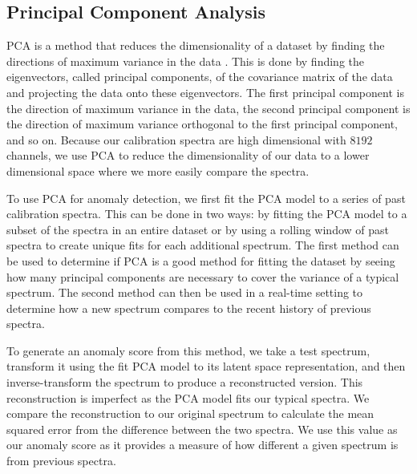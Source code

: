 \subsection{Principal Component Analysis}
PCA is a method that reduces the dimensionality of a dataset by finding the directions of maximum variance in the data \parencite{wold1987principal}.
This is done by finding the eigenvectors, called principal components, of the covariance matrix of the data and projecting the data onto these eigenvectors.
The first principal component is the direction of maximum variance in the data, the second principal component is the direction of maximum variance orthogonal to the first principal component, and so on.
Because our calibration spectra are high dimensional with $8192$ channels, we use PCA to reduce the dimensionality of our data to a lower dimensional space where we more easily compare the spectra.

To use PCA for anomaly detection, we first fit the PCA model to a series of past calibration spectra.
This can be done in two ways: by fitting the PCA model to a subset of the spectra in an entire dataset or by using a rolling window of past spectra to create unique fits for each additional spectrum. 
The first method can be used to determine if PCA is a good method for fitting the dataset by seeing how many principal components are necessary to cover the variance of a typical spectrum. 
The second method can then be used in a real-time setting to determine how a new spectrum compares to the recent history of previous spectra. 

To generate an anomaly score from this method, we take a test spectrum, transform it using the fit PCA model to its latent space representation, and then inverse-transform the spectrum to produce a reconstructed version. 
This reconstruction is imperfect as the PCA model fits our typical spectra.
We compare the reconstruction to our original spectrum to calculate the mean squared error from the difference between the two spectra. 
We use this value as our anomaly score as it provides a measure of how different a given spectrum is from previous spectra. 

